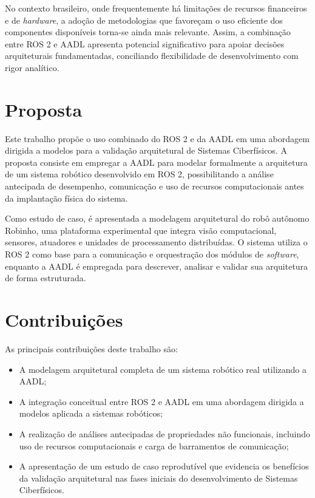 No contexto brasileiro, onde frequentemente há limitações de recursos financeiros e de \textit{hardware}, a adoção de metodologias que favoreçam o uso eficiente dos componentes disponíveis torna-se ainda mais relevante. Assim, a combinação entre ROS 2 e AADL apresenta potencial significativo para apoiar decisões arquiteturais fundamentadas, conciliando flexibilidade de desenvolvimento com rigor analítico. 

\section{Proposta} 

Este trabalho propõe o uso combinado do ROS 2 e da AADL em uma abordagem dirigida a modelos para a validação arquitetural de Sistemas Ciberfísicos. A proposta consiste em empregar a AADL para modelar formalmente a arquitetura de um sistema robótico desenvolvido em ROS 2, possibilitando a análise antecipada de desempenho, comunicação e uso de recursos computacionais antes da implantação física do sistema. 

Como estudo de caso, é apresentada a modelagem arquitetural do robô autônomo Robinho, uma plataforma experimental que integra visão computacional, sensores, atuadores e unidades de processamento distribuídas. O sistema utiliza o ROS 2 como base para a comunicação e orquestração dos módulos de \textit{software}, enquanto a AADL é empregada para descrever, analisar e validar sua arquitetura de forma estruturada. 

\section{Contribuições} 

As principais contribuições deste trabalho são: 
\begin{itemize}     
    \item A modelagem arquitetural completa de um sistema robótico real utilizando a AADL;     
    \item A integração conceitual entre ROS 2 e AADL em uma abordagem dirigida a modelos aplicada a sistemas robóticos;     
    \item A realização de análises antecipadas de propriedades não funcionais, incluindo uso de recursos computacionais e carga de barramentos de comunicação;     
    \item A apresentação de um estudo de caso reprodutível que evidencia os benefícios da validação arquitetural nas fases iniciais do desenvolvimento de Sistemas Ciberfísicos. 
\end{itemize} 

